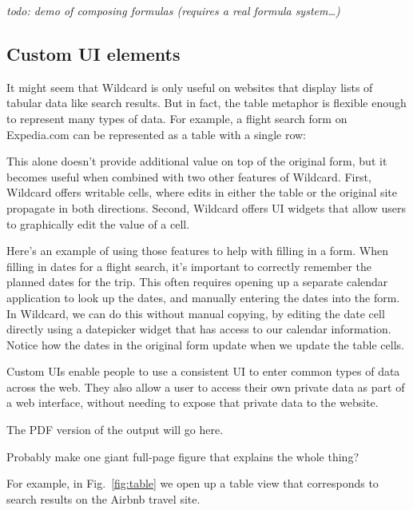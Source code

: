 \documentclass[english,submission]{programming}
\begin{document}
\emph{todo: demo of composing formulas (requires a real formula
system\ldots)}

\hypertarget{custom-ui-elements}{%
\subsection{Custom UI elements}\label{custom-ui-elements}}

It might seem that Wildcard is only useful on websites that display
lists of tabular data like search results. But in fact, the table
metaphor is flexible enough to represent many types of data. For
example, a flight search form on Expedia.com can be represented as a
table with a single row:

This alone doesn't provide additional value on top of the original form,
but it becomes useful when combined with two other features of Wildcard.
First, Wildcard offers writable cells, where edits in either the table
or the original site propagate in both directions. Second, Wildcard
offers UI widgets that allow users to graphically edit the value of a
cell.

Here's an example of using those features to help with filling in a
form. When filling in dates for a flight search, it's important to
correctly remember the planned dates for the trip. This often requires
opening up a separate calendar application to look up the dates, and
manually entering the dates into the form. In Wildcard, we can do this
without manual copying, by editing the date cell directly using a
datepicker widget that has access to our calendar information. Notice
how the dates in the original form update when we update the table
cells.

Custom UIs enable people to use a consistent UI to enter common types of
data across the web. They also allow a user to access their own private
data as part of a web interface, without needing to expose that private
data to the website.

The PDF version of the output will go here.

Probably make one giant full-page figure that explains the whole thing?

For example, in Fig.~\ref{fig:table} we open up a table view that
corresponds to search results on the Airbnb travel site.
\end{document}
